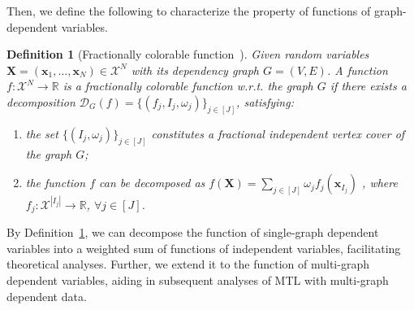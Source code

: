 \documentclass{article}
\def\sR{\mathbb{R}}
\def\vx{{\mathbf{x}}}
\def\mX{{\mathbf{X}}}
\newtheorem{definition}{Definition}
\begin{document}
Then, we define the following to characterize the property of functions of graph-dependent variables.
\begin{definition}[Fractionally colorable function~\cite{ralaivola2015entropy}] \label{def: franctionally colorable single}
    Given random variables \(\mX = (\vx_1, \ldots, \vx_N) \in \mathcal{X}^N\) with its dependency graph $G = (V, E)$.
    A function $f: \mathcal{X}^N \rightarrow \sR$ is a fractionally colorable function w.r.t. the graph $G$ if there exists a decomposition $\mathcal{D}_{G}(f) = \{ (f_{j}, I_{j}, \omega_{j}) \}_{j \in [J]}$,  satisfying: 
    \begin{enumerate}[(1)]
    \setlength\itemsep{-0.2pt}
    \vspace{-0.1in}
        \item the set \(\{ (I_{j}, \omega_{j}) \}_{j \in [J]}\) constitutes a fractional independent vertex cover of the graph \(G\);
        \item the function $f$ can be decomposed as \(f(\mX) = \sum_{j \in [J]} \omega_j f_j (\vx_{I_j})\) ,
            where $f_j: \mathcal{X}^{|I_j|} \rightarrow \sR$, \( \forall j \in [J]\).
    \end{enumerate}
\end{definition}
By Definition~\ref{def: franctionally colorable single}, we can decompose the function of single-graph dependent variables into a weighted sum of functions of independent variables, facilitating theoretical analyses. 
Further, we extend it to the function of multi-graph dependent variables, aiding in subsequent analyses of MTL with multi-graph dependent data.
\end{document}
